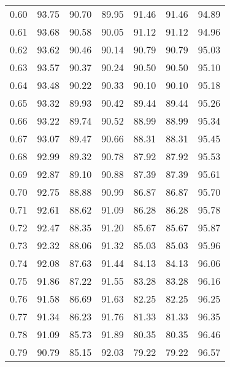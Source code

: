 \begin{tabular}{|c|c|c|c|c|c|c|}
      0.60 &     93.75 &     90.70 &      89.95 &   91.46 &      91.46 &         94.89 \\
      0.61 &     93.68 &     90.58 &      90.05 &   91.12 &      91.12 &         94.96 \\
      0.62 &     93.62 &     90.46 &      90.14 &   90.79 &      90.79 &         95.03 \\
      0.63 &     93.57 &     90.37 &      90.24 &   90.50 &      90.50 &         95.10 \\
      0.64 &     93.48 &     90.22 &      90.33 &   90.10 &      90.10 &         95.18 \\
      0.65 &     93.32 &     89.93 &      90.42 &   89.44 &      89.44 &         95.26 \\
      0.66 &     93.22 &     89.74 &      90.52 &   88.99 &      88.99 &         95.34 \\
      0.67 &     93.07 &     89.47 &      90.66 &   88.31 &      88.31 &         95.45 \\
      0.68 &     92.99 &     89.32 &      90.78 &   87.92 &      87.92 &         95.53 \\
      0.69 &     92.87 &     89.10 &      90.88 &   87.39 &      87.39 &         95.61 \\
      0.70 &     92.75 &     88.88 &      90.99 &   86.87 &      86.87 &         95.70 \\
      0.71 &     92.61 &     88.62 &      91.09 &   86.28 &      86.28 &         95.78 \\
      0.72 &     92.47 &     88.35 &      91.20 &   85.67 &      85.67 &         95.87 \\
      0.73 &     92.32 &     88.06 &      91.32 &   85.03 &      85.03 &         95.96 \\
      0.74 &     92.08 &     87.63 &      91.44 &   84.13 &      84.13 &         96.06 \\
      0.75 &     91.86 &     87.22 &      91.55 &   83.28 &      83.28 &         96.16 \\
      0.76 &     91.58 &     86.69 &      91.63 &   82.25 &      82.25 &         96.25 \\
      0.77 &     91.34 &     86.23 &      91.76 &   81.33 &      81.33 &         96.35 \\
      0.78 &     91.09 &     85.73 &      91.89 &   80.35 &      80.35 &         96.46 \\
      0.79 &     90.79 &     85.15 &      92.03 &   79.22 &      79.22 &         96.57 \\

\end{tabular}
